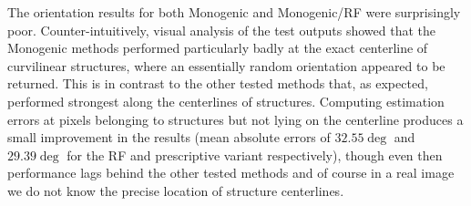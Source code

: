 The orientation results for both Monogenic and Monogenic/RF were surprisingly poor. Counter-intuitively, visual analysis of the test outputs showed that the Monogenic methods performed particularly badly at the exact centerline of curvilinear structures, where an essentially random orientation appeared to be returned. This is in contrast to the other tested methods that, as expected, performed strongest along the centerlines of structures. Computing estimation errors at pixels belonging to structures but not lying on the centerline produces a small improvement in the results (mean absolute errors of $32.55 \deg$ and $29.39 \deg$ for the RF and prescriptive variant respectively), though even then performance lags behind the other tested methods and of course in a real image we do not know the precise location of structure centerlines. 

